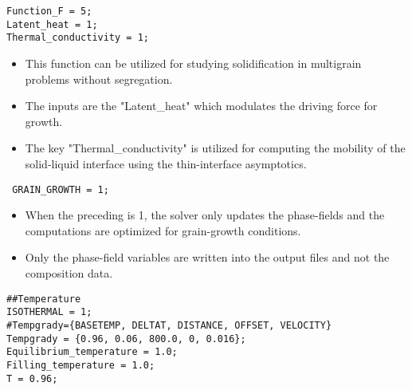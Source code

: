 \documentclass[a4paper,10pt]{article}
\begin{document}
\begin{lstlisting}
Function_F = 5;
Latent_heat = 1;
Thermal_conductivity = 1;
\end{lstlisting}

\begin{itemize}
 \item This function can be utilized for studying solidification in multigrain problems without segregation.
 \item The inputs are the "Latent\_heat" which modulates the driving force for growth.
 \item The key "Thermal\_conductivity" is utilized for computing the mobility of the solid-liquid interface using the thin-interface asymptotics.
\end{itemize}

\begin{lstlisting}
 GRAIN_GROWTH = 1;
\end{lstlisting}

\begin{itemize}
 \item When the preceding is 1, the solver only updates the phase-fields and the computations are optimized for grain-growth conditions.
 \item Only the phase-field variables are written into the output files and not the composition data.
\end{itemize}

\begin{lstlisting}
##Temperature
ISOTHERMAL = 1;
#Tempgrady={BASETEMP, DELTAT, DISTANCE, OFFSET, VELOCITY}
Tempgrady = {0.96, 0.06, 800.0, 0, 0.016};
Equilibrium_temperature = 1.0;
Filling_temperature = 1.0;
T = 0.96;
\end{lstlisting}
\end{document}
